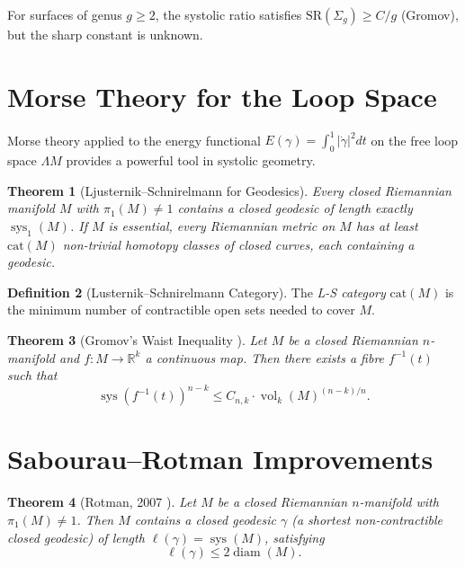 \documentclass[12pt,a4paper]{amsart}
\newtheorem{theorem}{Theorem}[section]
\theoremstyle{definition}
\newtheorem{definition}[theorem]{Definition}
\theoremstyle{remark}
\DeclareMathOperator{\sys}{sys}
\DeclareMathOperator{\vol}{vol}
\DeclareMathOperator{\diam}{diam}
\newcommand{\RR}{\mathbb{R}}
\begin{document}
For surfaces of genus $g \ge 2$, the systolic ratio satisfies
$\mathrm{SR}(\Sigma_g) \ge C/g$ (Gromov), but the sharp constant is unknown.

\section{Morse Theory for the Loop Space}

Morse theory applied to the energy functional $E(\gamma) = \int_0^1 |\dot\gamma|^2 dt$
on the free loop space $\Lambda M$ provides a powerful tool in systolic geometry.

\begin{theorem}[Ljusternik--Schnirelmann for Geodesics]
Every closed Riemannian manifold $M$ with $\pi_1(M) \neq 1$ contains a
\emph{closed geodesic} of length exactly $\sys_1(M)$.  If $M$ is essential,
every Riemannian metric on $M$ has at least $\mathrm{cat}(M)$ non-trivial
homotopy classes of closed curves, each containing a geodesic.
\end{theorem}

\begin{definition}[Lusternik--Schnirelmann Category]
The \emph{L-S category} $\mathrm{cat}(M)$ is the minimum number of
contractible open sets needed to cover $M$.
\end{definition}

\begin{theorem}[Gromov's Waist Inequality \cite{Gromov2003waist}]
Let $M$ be a closed Riemannian $n$-manifold and $f \colon M \to \RR^k$ a
continuous map.  Then there exists a fibre $f^{-1}(t)$ such that
\[
  \sys(f^{-1}(t))^{n-k} \le C_{n,k} \cdot \vol_k(M)^{(n-k)/n}.
\]
\end{theorem}

\section{Sabourau--Rotman Improvements}

\begin{theorem}[Rotman, 2007 \cite{Rotman2007}]
Let $M$ be a closed Riemannian $n$-manifold with $\pi_1(M) \neq 1$.
Then $M$ contains a closed geodesic $\gamma$ (a shortest non-contractible
closed geodesic) of length $\ell(\gamma) = \sys(M)$, satisfying
\[
  \ell(\gamma) \le 2 \diam(M).
\]
\end{theorem}
\end{document}

